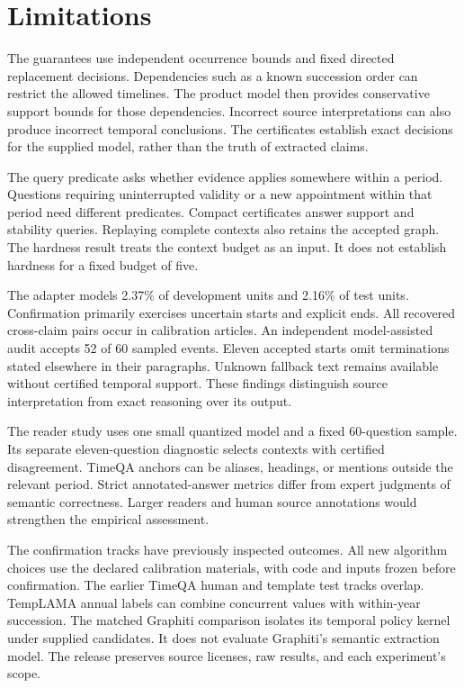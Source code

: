 \section*{Limitations}
The guarantees use independent occurrence bounds and fixed directed replacement decisions.
Dependencies such as a known succession order can restrict the allowed timelines.
The product model then provides conservative support bounds for those dependencies.
Incorrect source interpretations can also produce incorrect temporal conclusions.
The certificates establish exact decisions for the supplied model, rather than the truth of extracted claims.

The query predicate asks whether evidence applies somewhere within a period.
Questions requiring uninterrupted validity or a new appointment within that period need different predicates.
Compact certificates answer support and stability queries.
Replaying complete contexts also retains the accepted graph.
The hardness result treats the context budget as an input.
It does not establish hardness for a fixed budget of five.

The adapter models 2.37\% of development units and 2.16\% of test units.
Confirmation primarily exercises uncertain starts and explicit ends.
All recovered cross-claim pairs occur in calibration articles.
An independent model-assisted audit accepts 52 of 60 sampled events.
Eleven accepted starts omit terminations stated elsewhere in their paragraphs.
Unknown fallback text remains available without certified temporal support.
These findings distinguish source interpretation from exact reasoning over its output.

The reader study uses one small quantized model and a fixed 60-question sample.
Its separate eleven-question diagnostic selects contexts with certified disagreement.
TimeQA anchors can be aliases, headings, or mentions outside the relevant period.
Strict annotated-answer metrics differ from expert judgments of semantic correctness.
Larger readers and human source annotations would strengthen the empirical assessment.

The confirmation tracks have previously inspected outcomes.
All new algorithm choices use the declared calibration materials, with code and inputs frozen before confirmation.
The earlier TimeQA human and template test tracks overlap.
TempLAMA annual labels can combine concurrent values with within-year succession.
The matched Graphiti comparison isolates its temporal policy kernel under supplied candidates.
It does not evaluate Graphiti's semantic extraction model.
The release preserves source licenses, raw results, and each experiment's scope.
